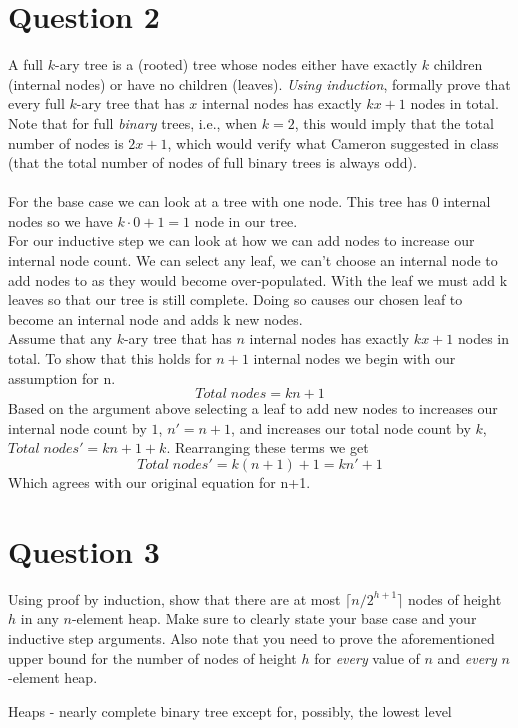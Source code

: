 \documentclass{article}
\begin{document}
\section*{Question 2}
A full $k$-ary tree is a (rooted) tree whose nodes either have exactly $k$ children
(internal nodes) or have no children (leaves). \emph{Using induction}, formally prove that every full
$k$-ary tree that has $x$ internal nodes has exactly $kx+1$ nodes in total. Note that for full
\emph{binary} trees, i.e., when $k=2$, this would imply that the total number of nodes is $2x+1$,
which would verify what Cameron suggested in class (that the total number of nodes of full binary
trees is always odd).
\\
\\
For the base case we can look at a tree with one node. This tree has $0$ internal nodes so we have $k\cdot 0 + 1=1$ node in our tree.
\\
For our inductive step we can look at how we can add nodes to increase our internal node count.
We can select any leaf, we can't choose an internal node to add nodes to as they would become over-populated.
With the leaf we must add k leaves so that our tree is still complete.
Doing so causes our chosen leaf to become an internal node and adds k new nodes.
\\
Assume that any $k$-ary tree that has $n$ internal nodes has exactly $kx+1$ nodes in total.
To show that this holds for $n+1$ internal nodes we begin with our assumption for n.
$$Total \; nodes = kn+1$$
Based on the argument above selecting a leaf to add new nodes to increases our internal node count by $1$, $n'=n+1$, and increases our total node count by $k$, $Total \; nodes'=kn+1+k$.
Rearranging these terms we get
$$Total \; nodes' = k(n+1)+1 = kn'+1$$
Which agrees with our original equation for n+1.


\section*{Question 3}
Using proof by induction, show that there are at most $\lceil n/2^{h+1}\rceil$
nodes of height $h$ in any $n$-element heap. Make sure to clearly state your base case and your
inductive step arguments. Also note that you need to prove the aforementioned upper bound for the
number of nodes of height $h$ for \emph{every} value of $n$ and \emph{every} $n$-element heap.

Heaps - nearly complete binary tree except for, possibly, the lowest level
\end{document}

